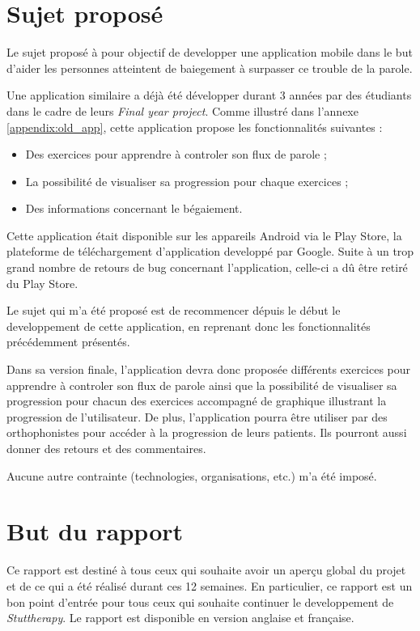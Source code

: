 \section{Sujet proposé}

Le sujet proposé à pour objectif de developper une application mobile dans le but d'aider les personnes atteintent de baiegement à surpasser ce trouble de la parole.

Une application similaire a déjà été développer durant 3 années par des étudiants dans le cadre de leurs \textit{Final year project}. Comme illustré dans l'annexe \ref{appendix:old_app}, cette application propose les fonctionnalités suivantes :

\begin{itemize}
  \item Des exercices pour apprendre à controler son flux de parole ;
  \item La possibilité de visualiser sa progression pour chaque exercices ;
  \item Des informations concernant le bégaiement.
\end{itemize}

Cette application était disponible sur les appareils Android via le Play Store, la plateforme de téléchargement d'application developpé par Google. Suite à un trop grand nombre de retours de bug concernant l'application, celle-ci a dû être retiré du Play Store.

Le sujet qui m'a été proposé est de recommencer dépuis le début le developpement de cette application, en reprenant donc les fonctionnalités précédemment présentés.

Dans sa version finale, l'application devra donc proposée différents exercices pour apprendre à controler son flux de parole ainsi que la possibilité de visualiser sa progression pour chacun des exercices accompagné de graphique illustrant la progression de l'utilisateur. De plus, l'application pourra être utiliser par des orthophonistes pour accéder à la progression de leurs patients. Ils pourront aussi donner des retours et des commentaires.

Aucune autre contrainte (technologies, organisations, etc.) m'a été imposé.


\section{But du rapport}
Ce rapport est destiné à tous ceux qui souhaite avoir un aperçu global du projet et de ce qui a été réalisé durant ces 12 semaines. En particulier, ce rapport est un bon point d'entrée pour tous ceux qui souhaite continuer le developpement de \textit{Stuttherapy}. Le rapport est disponible en version anglaise et française.

